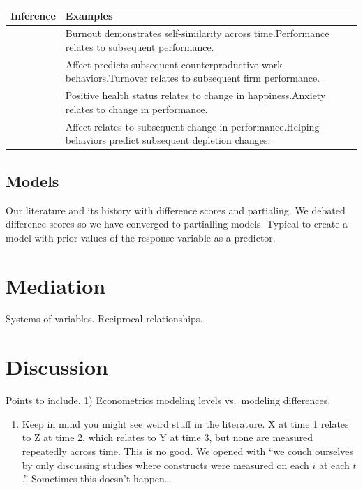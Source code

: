 \documentclass[english,,man]{apa6}
\providecommand{\tightlist}{%
  \setlength{\itemsep}{0pt}\setlength{\parskip}{0pt}}
\theoremstyle{definition}
\theoremstyle{definition}
\theoremstyle{definition}
\theoremstyle{remark}
\begin{document}
\begin{tabular}{>{\raggedright\arraybackslash}p{5em}>{\raggedright\arraybackslash}p{30em}}
\toprule
Inference & Examples\\
\midrule
1 & Burnout demonstrates self-similarity across time.\newline Performance relates to subsequent performance.\\
\hline
2 & Affect predicts subsequent counterproductive work behaviors.\newline Turnover relates to subsequent firm performance.\\
\hline
3 & Positive health status relates to change in happiness.\newline Anxiety relates to change in performance.\\
\hline
4 & Affect relates to subsequent change in performance.\newline Helping behaviors predict subsequent depletion changes.\\
\bottomrule
\end{tabular}

\hypertarget{models-2}{%
\subsection{Models}\label{models-2}}

Our literature and its history with difference scores and partialing. We
debated difference scores so we have converged to partialling models.
Typical to create a model with prior values of the response variable as
a predictor.

\hypertarget{mediation}{%
\section{Mediation}\label{mediation}}

Systems of variables. Reciprocal relationships.

\hypertarget{discussion}{%
\section{Discussion}\label{discussion}}

Points to include. 1) Econometrics modeling levels vs.~modeling
differences.

\begin{enumerate}
\def\labelenumi{\arabic{enumi})}
\setcounter{enumi}{1}
\tightlist
\item
  Keep in mind you might see weird stuff in the literature. X at time 1
  relates to Z at time 2, which relates to Y at time 3, but none are
  measured repeatedly across time. This is no good. We opened with
  \enquote{we couch ourselves by only discussing studies where
  constructs were measured on each \(i\) at each \(t\).} Sometimes this
  doesn't happen\ldots{}
\end{enumerate}
\end{document}
